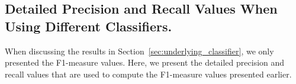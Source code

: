 

\clearpage
\subsection*{Detailed Precision and Recall Values When Using Different Classifiers.}

When discussing the results in Section~\ref{sec:underlying_classifier}, we only presented the F1-measure values. Here, we present the detailed precision and recall values that are used to compute the F1-measure values presented earlier.

